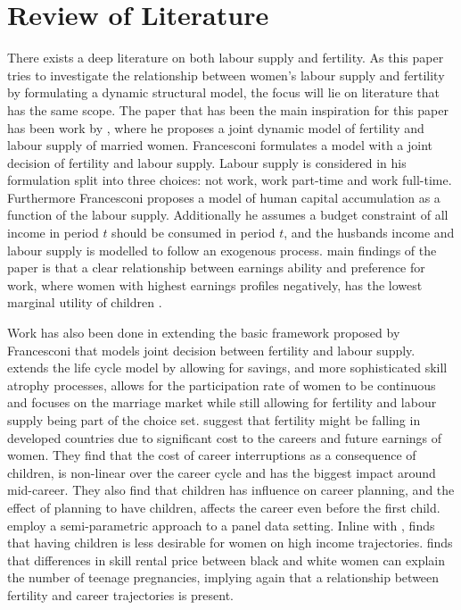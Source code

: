 \section{Review of Literature}\label{sec:lit_review}

There exists a deep literature on both labour supply and fertility.
As this paper tries to investigate the relationship between women's labour supply and fertility by formulating a dynamic  structural model, the focus will lie on literature that has the same scope. The paper that has been the main inspiration for this paper has been work by \textcite{francesconi_joint_2002}, where he proposes a joint dynamic model of fertility and labour supply of married women. Francesconi formulates a model with a joint decision of fertility and labour supply. Labour supply is considered in his formulation split into three choices: not work, work part-time and work full-time. Furthermore Francesconi proposes a model of human capital accumulation as a function of the labour supply. Additionally he assumes a budget constraint of all income in period $t$ should be consumed in period $t$, and the husbands income and labour supply is modelled to follow an exogenous process.  main findings of the paper is that a clear relationship between earnings ability and preference for work, where women with highest earnings profiles negatively, has the lowest marginal utility of children \parencite{francesconi_joint_2002}.

Work has also been done in extending the basic framework proposed by Francesconi that models joint decision between fertility and labour supply.  \textcite{adda_career_2011} extends the life cycle model by allowing for savings, and more sophisticated skill atrophy processes,  \textcite{gayle_life-cyle_2006} allows for the participation rate of women to be continuous and \textcite{keane_role_2010} focuses on the marriage market while still allowing for fertility and labour supply being part of the choice set. \textcite{adda_career_2011} suggest that fertility might be falling in developed countries due to significant cost to the careers and future earnings of women. They find that the cost of career interruptions as a consequence of children, is non-linear over the career cycle and has the biggest impact around mid-career. They also find that children has influence on career planning, and the effect of planning to have children, affects the career even before the first child. \textcite{gayle_life-cyle_2006} employ a semi-parametric approach to a panel data setting. Inline with \textcite{francesconi_joint_2002}, \textcite{gayle_life-cyle_2006} finds that having children is less desirable for women on high income trajectories. \textcite{keane_role_2010} finds that differences in skill rental price between black and white women can explain the number of teenage pregnancies, implying again that a relationship between fertility and career trajectories is present.

